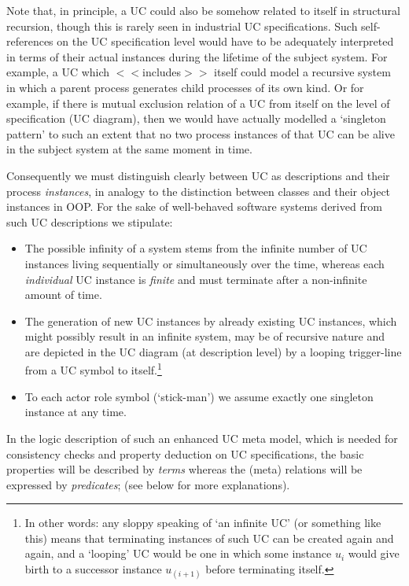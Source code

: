 Note that, in principle, a UC could also be somehow related to itself 
in structural recursion, though this is rarely seen in industrial UC 
specifications. Such self-references on the UC specification level 
would have to be adequately interpreted in terms of their actual 
instances during the lifetime of the subject system. For example, 
a UC which $<<$includes$>>$ itself could model a recursive system 
in which a parent process generates child processes of its own kind. 
Or for example, if there is mutual exclusion relation of a UC from 
itself on the level of specification (UC diagram), then we would have 
actually modelled a `singleton pattern' to such an extent that no two 
process instances of that UC can be alive in the subject system at the 
same moment in time.

Consequently we must distinguish clearly between UC as descriptions 
and their process \emph{instances}, in analogy to the distinction 
between classes and their object instances in OOP. For the sake of 
well-behaved software systems derived from such UC descriptions we 
stipulate:
\begin{itemize}
\item
The possible infinity of a system stems from the infinite number of UC 
instances living sequentially or simultaneously over the time, whereas 
each \emph{individual} UC instance is \emph{finite} and must terminate 
after a non-infinite amount of time.
\item
The generation of new UC instances by already existing UC instances, 
which might possibly result in an infinite system, may be of recursive 
nature and are depicted in the UC diagram (at description level) by a 
looping trigger-line from a UC symbol to itself.\footnote{In other words: 
  any sloppy speaking of `an infinite UC' (or something like this) means 
  that terminating instances of such UC can be created again and again, 
  and a `looping' UC would be one in which some instance $u_{i}$ would 
  give birth to a successor instance $u_{(i+1)}$ before terminating 
  itself.}
\item
To each actor role symbol (`stick-man') we assume exactly one singleton 
instance at any time.
\end{itemize}
In the logic description of such an enhanced UC meta model, which 
is needed for consistency checks and property deduction on UC 
specifications, the basic properties will be described by \emph{terms} 
whereas the (meta) relations will be expressed by \emph{predicates}; 
(see below for more explanations).

